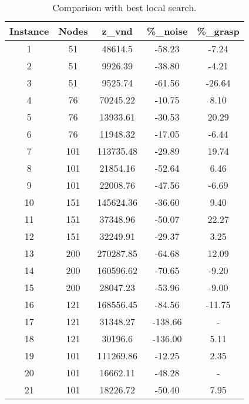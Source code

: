 \documentclass[10pt,twoside]{article}
\begin{document}
\begin{table}[H]
\centering
\begin{tabular}{ccccc}
\hline
\textbf{Instance} & \textbf{Nodes} & \textbf{z\_vnd} & \textbf{\%\_noise} & \textbf{\%\_grasp} \\ \hline
1                 & 51             & 48614.5         & -58.23             & -7.24              \\
2                 & 51             & 9926.39         & -38.80             & -4.21              \\
3                 & 51             & 9525.74         & -61.56             & -26.64             \\
4                 & 76             & 70245.22        & -10.75             & 8.10               \\
5                 & 76             & 13933.61        & -30.53             & 20.29              \\
6                 & 76             & 11948.32        & -17.05             & -6.44              \\
7                 & 101            & 113735.48       & -29.89             & 19.74              \\
8                 & 101            & 21854.16        & -52.64             & 6.46               \\
9                 & 101            & 22008.76        & -47.56             & -6.69              \\
10                & 151            & 145624.36       & -36.60             & 9.40               \\
11                & 151            & 37348.96        & -50.07             & 22.27              \\
12                & 151            & 32249.91        & -29.37             & 3.25               \\
13                & 200            & 270287.85       & -64.68             & 12.09              \\
14                & 200            & 160596.62       & -70.65             & -9.20              \\
15                & 200            & 28047.23        & -53.96             & -9.00              \\
16                & 121            & 168556.45       & -84.56             & -11.75             \\
17                & 121            & 31348.27        & -138.66            & -                  \\
18                & 121            & 30196.6         & -136.00            & 5.11               \\
19                & 101            & 111269.86       & -12.25             & 2.35               \\
20                & 101            & 16662.11        & -48.28             & -                  \\
21                & 101            & 18226.72        & -50.40             & 7.95               \\ \hline
\end{tabular}
\caption{Comparison with best local search.}
\label{tab:compar}
\end{table}
\end{document}
